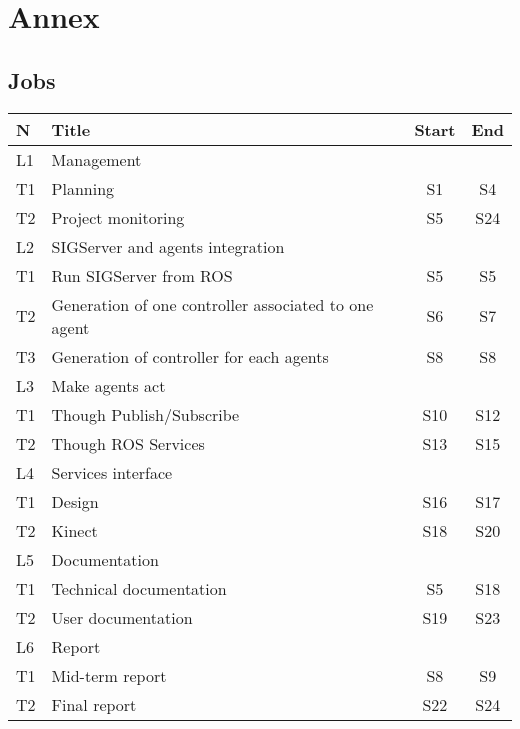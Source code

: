 \chapter{Annex}
\setlength{\parskip}{2.5ex plus .4ex minus .4ex}
\section{Jobs}
\noindent\begin{minipage}{\linewidth}%
\begin{center}
\begin{tabular}{| l | m{8cm} | c | c |}
\hline
	N & Title & Start & End\\\hline
	\rowcolor{cyan} L1 & Management & & \\
	T1	& Planning & S1 & S4\\
	T2	& Project monitoring & S5 & S24\\
	\rowcolor{cyan}L2 & SIGServer and agents integration & &\\
	T1	& Run SIGServer from ROS & S5 & S5\\
	T2	& Generation of one controller associated to one agent & S6 & S7\\
	T3	& Generation of controller for each agents & S8 & S8 \\
	\rowcolor{cyan}L3 & Make agents act & &\\
	T1	& Though Publish/Subscribe & S10 & S12\\
	T2	& Though ROS Services & S13 & S15\\
	\rowcolor{cyan}L4 & Services interface & &\\
	T1	& Design & S16 & S17\\
	T2	& Kinect & S18 & S20\\
	\rowcolor{cyan}L5 & Documentation & &\\
	T1	& Technical documentation & S5 & S18\\
	T2	& User documentation & S19& S23\\
	\rowcolor{cyan}L6 & Report & &\\
	T1	& Mid-term report & S8 & S9\\
	T2	& Final report & S22 & S24\\\hline
\end{tabular}
\end{center}
\label{tab:lots}%
\end{minipage}

